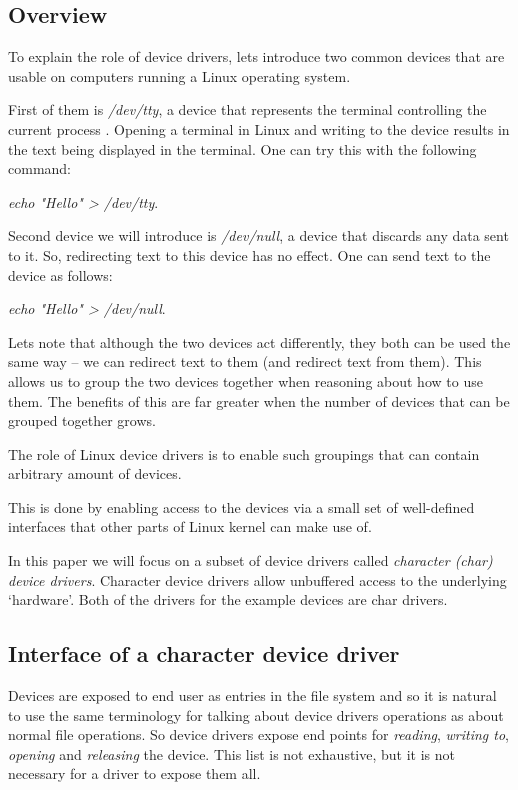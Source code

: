 \documentclass[..thesis.tex]{subfiles}
\begin{document}
\subsection{Overview}


To explain the role of device drivers, lets introduce two common devices that are usable on computers running a Linux operating system.

First of them is \textit{/dev/tty}, a device that represents the terminal controlling the current process \cite{torvalds_linux}. Opening a terminal in Linux and writing to the device results in the text being displayed in the terminal. One can try this with the following command: 

\textit{echo "Hello" > /dev/tty}.
 
Second device we will introduce is \textit{/dev/null}, a device that discards any data sent to it. So, redirecting text to this device has no effect.
One can send text to the device as follows:

\textit{echo "Hello" > /dev/null}.

Lets note that although the two devices act differently, they both can be used the same way -- we can redirect text to them (and redirect text from them). This allows us to group the two devices together when reasoning about how to use them. The benefits of this are far greater when the number of devices that can be grouped together grows.

The role of Linux device drivers is to enable such groupings that can contain arbitrary amount of devices.

This is done by enabling access to the devices via a small set of well-defined interfaces that other parts of Linux kernel can make use of. 

In this paper we will focus on a subset of device drivers called \textit{character (char) device drivers}. Character device drivers allow unbuffered access to the underlying `hardware'. Both of the drivers for the example devices are char drivers.

\subsection{Interface of a character device driver}

Devices are exposed to end user as entries in the file system and so it is natural to use the same terminology for talking about device drivers operations as about normal file operations. So device drivers expose end points for \textit{reading}, \textit{writing to}, \textit{opening} and \textit{releasing} the device. This list is not exhaustive\cite[include/linux/fs.h]{torvalds_linux}, but it is not necessary for a driver to expose them all.
\end{document}
